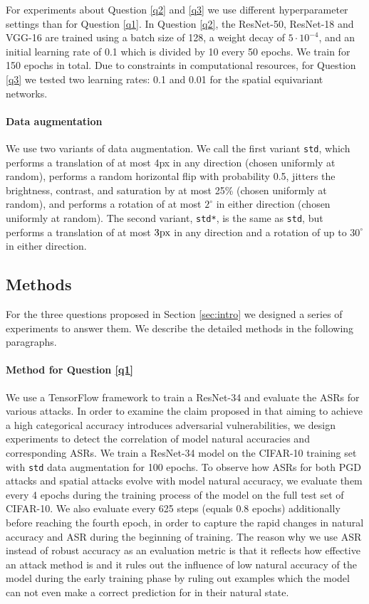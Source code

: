 For experiments about Question \ref{q2} and \ref{q3} we use different hyperparameter settings than for Question \ref{q1}. In Question \ref{q2}, the ResNet-50, ResNet-18 and VGG-16 are trained using a batch size of 128, a weight decay of $5 \cdot 10^{-4}$, and an initial learning rate of 0.1 which is divided by 10 every 50 epochs. We train for 150 epochs in total. Due to constraints in computational resources, for Question \ref{q3} we tested two learning rates: 0.1 and 0.01 for the spatial equivariant networks.

\paragraph{Data augmentation} We use two variants of data augmentation. We call the first variant \texttt{std}, which performs a translation of at most 4px in any direction (chosen uniformly at random), performs a random horizontal flip with probability 0.5, jitters the brightness, contrast, and saturation by at most 25\% (chosen uniformly at random), and performs a rotation of at most $2^\circ$ in either direction (chosen uniformly at random). The second variant, \texttt{std*}, is the same as \texttt{std}, but performs a translation of at most $3\textrm{px}$ in any direction and a rotation of up to $30^\circ$ in either direction.

\subsection{Methods}
For the three questions proposed in Section \ref{sec:intro} we designed a series of experiments to answer them. We describe the detailed methods in the following paragraphs.

\paragraph{Method for Question \ref{q1}} We use a TensorFlow \cite{Abadi2015} framework \cite{Engstrom17,Yang2019} to train a ResNet-34 and evaluate the ASRs for various attacks. In order to examine the claim proposed in \cite{Ilyas2019} that aiming to achieve a high categorical accuracy introduces adversarial vulnerabilities, we design experiments to detect the correlation of model natural accuracies and corresponding ASRs. We train a ResNet-34 model on the CIFAR-10 training set with \texttt{std} data augmentation for 100 epochs. To observe how ASRs for both PGD attacks and spatial attacks evolve with model natural accuracy, we evaluate them every 4 epochs during the training process of the model on the full test set of CIFAR-10. We also evaluate every 625 steps (equals 0.8 epochs) additionally before reaching the fourth epoch, in order to capture the rapid changes in natural accuracy and ASR during the beginning of training. The reason why we use ASR instead of robust accuracy as an evaluation metric is that it reflects how effective an attack method is and it rules out the influence of low natural accuracy of the model during the early training phase by ruling out examples which the model can not even make a correct prediction for in their natural state. 

